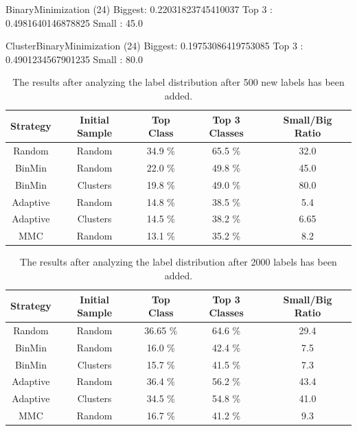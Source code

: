 BinaryMinimization (24)
Biggest: 0.22031823745410037
Top 3  : 0.4981640146878825
Small  : 45.0


ClusterBinaryMinimization (24)
Biggest: 0.19753086419753085
Top 3  : 0.4901234567901235
Small  : 80.0


\begin{table}[h!]
    \centering
    \begin{tabular}{|ccccc|}
        \hline
        \textbf{Strategy} & \textbf{Initial Sample} & \textbf{Top Class} & \textbf{Top 3 Classes} & \textbf{Small/Big Ratio}\\
        \hline
        Random & Random &  34.9 \% & 65.5 \% & 32.0 \\
        BinMin & Random &  22.0 \% & 49.8 \% & 45.0 \\
        BinMin & Clusters & 19.8 \% & 49.0 \% & 80.0 \\
        Adaptive & Random & 14.8 \% & 38.5 \% & 5.4 \\
        Adaptive & Clusters & 14.5 \% & 38.2 \% & 6.65 \\
        MMC & Random & 13.1 \% & 35.2 \% & 8.2 \\
        \hline
    \end{tabular}
    \caption{The results after analyzing the label distribution after 500 new labels has been added.}
    \label{tab:distribution-result-500}
\end{table}

\begin{table}[h!]
    \centering
    \begin{tabular}{|ccccc|}
        \hline
        \textbf{Strategy} & \textbf{Initial Sample} & \textbf{Top Class} & \textbf{Top 3 Classes} & \textbf{Small/Big Ratio}\\
        \hline
        Random & Random & 36.65 \% & 64.6 \% & 29.4 \\
        BinMin & Random & 16.0 \% & 42.4 \% & 7.5 \\
        BinMin & Clusters & 15.7 \% & 41.5 \% & 7.3 \\
        Adaptive & Random & 36.4 \% & 56.2 \% & 43.4 \\
        Adaptive & Clusters & 34.5 \% & 54.8 \% & 41.0 \\
        MMC & Random & 16.7 \% & 41.2 \% & 9.3 \\
        \hline
    \end{tabular}
    \caption{The results after analyzing the label distribution after 2000 labels has been added.}
    \label{tab:distribution-result-2000}
\end{table}